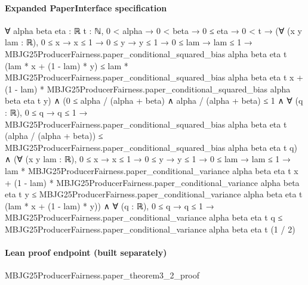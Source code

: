 \documentclass[10pt]{article}
\begin{document}
\paragraph{Expanded PaperInterface specification}
\begin{ReviewVerbatim}
∀ {alpha beta eta : ℝ} {t : ℕ},
  0 < alpha →
    0 < beta →
      0 ≤ eta →
        0 < t →
          (∀ (x y lam : ℝ),
              0 ≤ x →
                x ≤ 1 →
                  0 ≤ y →
                    y ≤ 1 →
                      0 ≤ lam →
                        lam ≤ 1 →
                          MBJG25ProducerFairness.paper_conditional_squared_bias alpha beta eta t
                              (lam * x + (1 - lam) * y) ≤
                            lam * MBJG25ProducerFairness.paper_conditional_squared_bias alpha beta eta t x +
                              (1 - lam) * MBJG25ProducerFairness.paper_conditional_squared_bias alpha beta eta t y) ∧
            (0 ≤ alpha / (alpha + beta) ∧
                alpha / (alpha + beta) ≤ 1 ∧
                  ∀ (q : ℝ),
                    0 ≤ q →
                      q ≤ 1 →
                        MBJG25ProducerFairness.paper_conditional_squared_bias alpha beta eta t
                            (alpha / (alpha + beta)) ≤
                          MBJG25ProducerFairness.paper_conditional_squared_bias alpha beta eta t q) ∧
              (∀ (x y lam : ℝ),
                  0 ≤ x →
                    x ≤ 1 →
                      0 ≤ y →
                        y ≤ 1 →
                          0 ≤ lam →
                            lam ≤ 1 →
                              lam * MBJG25ProducerFairness.paper_conditional_variance alpha beta eta t x +
                                  (1 - lam) * MBJG25ProducerFairness.paper_conditional_variance alpha beta eta t y ≤
                                MBJG25ProducerFairness.paper_conditional_variance alpha beta eta t
                                  (lam * x + (1 - lam) * y)) ∧
                ∀ (q : ℝ),
                  0 ≤ q →
                    q ≤ 1 →
                      MBJG25ProducerFairness.paper_conditional_variance alpha beta eta t q ≤
                        MBJG25ProducerFairness.paper_conditional_variance alpha beta eta t (1 / 2)
\end{ReviewVerbatim}



\paragraph{Lean proof endpoint (built separately)}\begin{ReviewVerbatim}
MBJG25ProducerFairness.paper_theorem3_2_proof
\end{ReviewVerbatim}
\end{document}
